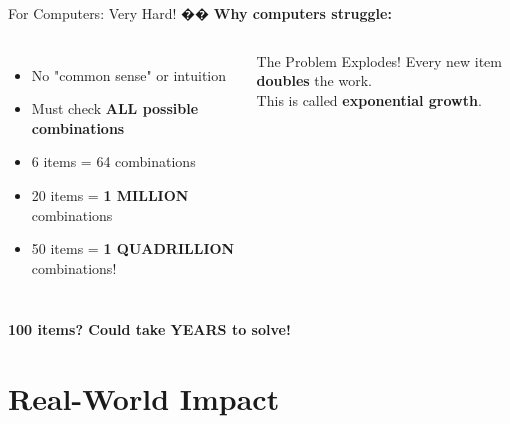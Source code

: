 \documentclass[aspectratio=169]{beamer}
\begin{document}
\begin{frame}{For Computers: Very Hard! ��}
\textbf{Why computers struggle:}

\begin{columns}
\begin{itemize}
    \item No "common sense" or intuition
    \item Must check \textbf{ALL possible combinations}
    \item 6 items = 64 combinations
    \item 20 items = \textbf{1 MILLION} combinations
    \item 50 items = \textbf{1 QUADRILLION} combinations!
\end{itemize}

\vspace{0.3cm}
\begin{block}{The Problem Explodes!}
Every new item \textbf{doubles} the work.\\
This is called \textbf{exponential growth}.
\end{block}

\end{columns}

\vspace{0.3cm}
\begin{center}
\textcolor{aired}{\Large \textbf{100 items? Could take YEARS to solve!}}
\end{center}
\end{frame}


\section{Real-World Impact}
\end{document}
